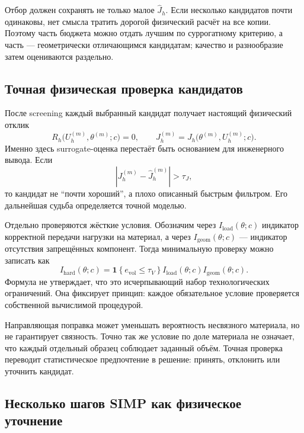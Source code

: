 Отбор должен сохранять не только малое $\widehat J_h$. Если несколько кандидатов почти одинаковы, нет смысла тратить дорогой физический расчёт на все копии. Поэтому часть бюджета можно отдать лучшим по суррогатному критерию, а часть --- геометрически отличающимся кандидатам; качество и разнообразие затем оцениваются раздельно.

\subsection{Точная физическая проверка кандидатов}

После screening каждый выбранный кандидат получает настоящий физический отклик
\begin{equation}
 R_h\bigl(U_h^{(m)},\theta^{(m)};c\bigr)=0,
 \qquad
 J_h^{(m)}
 =J_h\bigl(\theta^{(m)},U_h^{(m)};c\bigr).
\end{equation}
Именно здесь surrogate-оценка перестаёт быть основанием для инженерного вывода. Если
\begin{equation}
 \left|
  J_h^{(m)}-\widehat J_h^{(m)}
 \right|
 >\tau_J,
\end{equation}
то кандидат не ``почти хороший'', а плохо описанный быстрым фильтром. Его дальнейшая судьба определяется точной моделью.

Отдельно проверяются жёсткие условия. Обозначим через $I_{\mathrm{load}}(\theta;c)$ индикатор корректной передачи нагрузки на материал, а через $I_{\mathrm{geom}}(\theta;c)$ --- индикатор отсутствия запрещённых компонент. Тогда минимальную проверку можно записать как
\begin{equation}
 I_{\mathrm{hard}}(\theta;c)
 =
 \mathbf 1\!\left\{e_{\mathrm{vol}}\leq\tau_V\right\}
 I_{\mathrm{load}}(\theta;c)
 I_{\mathrm{geom}}(\theta;c).
\end{equation}
Формула не утверждает, что это исчерпывающий набор технологических ограничений. Она фиксирует принцип: каждое обязательное условие проверяется собственной вычислимой процедурой.

Направляющая поправка может уменьшать вероятность несвязного материала, но не гарантирует связность. Точно так же условие по доле материала не означает, что каждый отдельный образец соблюдает заданный объём. Точная проверка переводит статистическое предпочтение в решение: принять, отклонить или уточнить кандидат.

\subsection{Несколько шагов SIMP как физическое уточнение}

